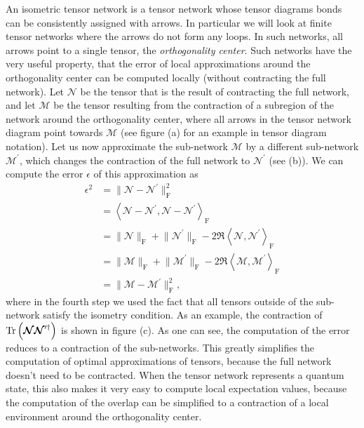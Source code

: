 An isometric tensor network is a tensor network whose tensor diagrams bonds can be consistently assigned with arrows. In particular we will look at finite tensor networks where the arrows do not form any loops. In such networks, all arrows point to a single tensor, the \textit{orthogonality center}. Such networks have the very useful property, that the error of local approximations around the orthogonality center can be computed locally (without contracting the full network). Let $\bm{\mathcal{N}}$ be the tensor that is the result of contracting the full network, and let $\bm{\mathcal{M}}$ be the tensor resulting from the contraction of a subregion of the network around the orthogonality center, where all arrows in the tensor network diagram point towards $\bm{\mathcal{M}}$ (see figure (a) for an example in tensor diagram notation). Let us now approximate the sub-network $\bm{\mathcal{M}}$ by a different sub-network $\bm{\mathcal{M}}^\prime$, which changes the contraction of the full network to $\bm{\mathcal{N}}^\prime$ (see (b)). We can compute the error $\epsilon$ of this approximation as
\begin{equation}
\begin{split}
	\epsilon^2 &= \lVert\bm{\mathcal{N}}-\bm{\mathcal{N}}^\prime\rVert^2_\text{F} \\
	&=
	\left\langle\bm{\mathcal{N}}-\bm{\mathcal{N}}^\prime, \bm{\mathcal{N}}-\bm{\mathcal{N}}^\prime\right\rangle_\text{F} \\
	&= \lVert\bm{\mathcal{N}}\rVert_\text{F} + \lVert\bm{\mathcal{N}}^\prime\rVert_\text{F} - 2\Re\left\langle\bm{\mathcal{N}},\bm{\mathcal{N}}^\prime\right\rangle_\text{F} \\
	&= \lVert\bm{\mathcal{M}}\rVert_\text{F} + \lVert\bm{\mathcal{M}}^\prime\rVert_\text{F} - 2\Re\left\langle\bm{\mathcal{M}},\bm{\mathcal{M}}^\prime\right\rangle_\text{F} \\
	&= \lVert\bm{\mathcal{M}}-\bm{\mathcal{M}}^\prime\rVert^2_\text{F},
\end{split}
\end{equation}
where in the fourth step we used the fact that all tensors outside of the sub-network satisfy the isometry condition. As an example, the contraction of $\operatorname{Tr}\left(\bm{\mathcal{N}}\bm{\mathcal{N}}^{\prime\dagger}\right)$ is shown in figure (c). As one can see, the computation of the error reduces to a contraction of the sub-networks. This greatly simplifies the computation of optimal approximations of tensors, because the full network doesn't need to be contracted. When the tensor network represents a quantum state, this also makes it very easy to compute local expectation values, because the computation of the overlap can be simplified to a contraction of a local environment around the orthogonality center.
